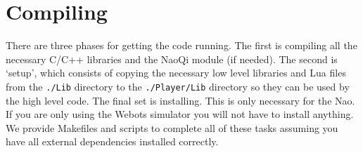 \documentclass{article}
\begin{document}
\section{Compiling}

  There are three phases for getting the code running. The first is compiling all the necessary C/C++ libraries and the NaoQi module (if needed). The second is `setup', which consists of copying the necessary low level libraries and Lua files from the \texttt{./Lib} directory to the \texttt{./Player/Lib} directory so they can be used by the high level code. The final set is installing. This is only necessary for the Nao. If you are only using the Webots simulator you will not have to install anything. We provide Makefiles and scripts to complete all of these tasks assuming you have all external dependencies installed correctly.
\end{document}
